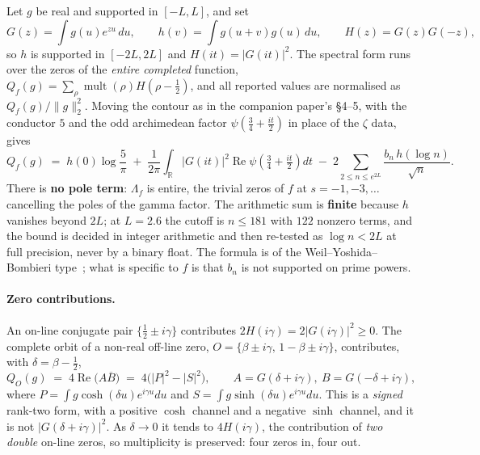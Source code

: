 \documentclass[11pt,a4paper]{article}
\theoremstyle{definition}
\theoremstyle{remark}
\begin{document}
Let $g$ be real and supported in $[-L,L]$, and set
\[
G(z) = \int g(u)e^{zu}\,du,\qquad h(v) = \int g(u+v)g(u)\,du,\qquad H(z) = G(z)G(-z),
\]
so $h$ is supported in $[-2L,2L]$ and $H(it) = |G(it)|^2$. The spectral form runs over
the zeros of the \emph{entire completed} function,
$Q_f(g) = \sum_\rho \operatorname{mult}(\rho)H(\rho-\tfrac12)$, and all reported values
are normalised as $Q_f(g)/\|g\|_2^2$. Moving the contour as in the companion paper's
\S4--5, with the conductor $5$ and the odd archimedean factor $\psi(\tfrac34+\tfrac{it}2)$
in place of the $\zeta$ data, gives
\begin{equation}\label{eq:form}
Q_f(g) \;=\; h(0)\log\frac{5}{\pi}
\;+\; \frac1{2\pi}\int_{\mathbb R}|G(it)|^2\operatorname{Re}\psi\!\left(\tfrac34+\tfrac{it}2\right)dt
\;-\; 2\!\!\sum_{2\le n\le e^{2L}}\!\! \frac{b_n\,h(\log n)}{\sqrt n}.
\end{equation}
There is \textbf{no pole term}: $\Lambda_f$ is entire, the trivial zeros of $f$ at
$s=-1,-3,\ldots$ cancelling the poles of the gamma factor. The arithmetic sum is
\textbf{finite} because $h$ vanishes beyond $2L$; at $L=2.6$ the cutoff is $n\le181$ with
$122$ nonzero terms, and the bound is decided in integer arithmetic and then re-tested as
$\log n < 2L$ at full precision, never by a binary float. The formula is of the
Weil--Yoshida--Bombieri type~\cite{Yoshida,Bombieri}; what is specific to $f$ is that
$b_n$ is not supported on prime powers.

\paragraph{Zero contributions.} An on-line conjugate pair $\{\tfrac12\pm i\gamma\}$
contributes $2H(i\gamma) = 2|G(i\gamma)|^2 \ge 0$. The complete orbit of a non-real
off-line zero, $O = \{\beta\pm i\gamma,\,1-\beta\pm i\gamma\}$, contributes, with
$\delta = \beta-\tfrac12$,
\begin{equation}\label{eq:orbit}
Q_O(g) \;=\; 4\operatorname{Re}\bigl(A\overline{B}\bigr) \;=\; 4\bigl(|P|^2-|S|^2\bigr),
\qquad A = G(\delta+i\gamma),\ B = G(-\delta+i\gamma),
\end{equation}
where $P = \int g\cosh(\delta u)e^{i\gamma u}du$ and
$S = \int g\sinh(\delta u)e^{i\gamma u}du$. This is a \emph{signed} rank-two form, with a
positive $\cosh$ channel and a negative $\sinh$ channel, and it is not
$|G(\delta+i\gamma)|^2$. As $\delta\to0$ it tends to $4H(i\gamma)$, the contribution of
\emph{two double} on-line zeros, so multiplicity is preserved: four zeros in, four out.
\end{document}
